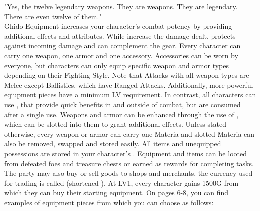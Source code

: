 {"Yes, the twelve legendary weapons. They are weapons. They are legendary. There are even twelve of them."\\}{Ghido}{
Equipment increases your character's combat potency by providing additional effects and attributes.
While  increase the damage dealt,  protects against incoming damage and  can complement the gear.
Every character can carry one weapon, one armor and one accessory.
Accessories can be worn by everyone, but characters can only equip specific weapon and armor types depending on their Fighting Style.
Note that Attacks with all weapon types are Melee except Ballistics, which have Ranged Attacks.
Additionally, more powerful eqiupment pieces have a minimum LV requirement.
In contrast, all characters can use , that provide quick benefits in and outside of combat, but are consumed after a single use.
Weapons and armor can be enhanced through the use of , which can be slotted into them to grant additional effects.
Unless stated otherwise, every weapon or armor can carry one Materia and slotted Materia can also be removed, swapped and stored easily.
All items and unequipped possessions are stored in your character's .
Equipment and items can be looted from defeated foes and treasure chests or earned as rewards for completing tasks.
The party may also buy or sell goods to shops and merchants, the currency used for trading is called  (shortened ).
At LV1, every character gains 1500G from which they can buy their starting equipment.
On pages 6-8, you can find examples of equipment pieces from which you can choose as follows:
\ofrow
{}
}
%
\newpage
%
